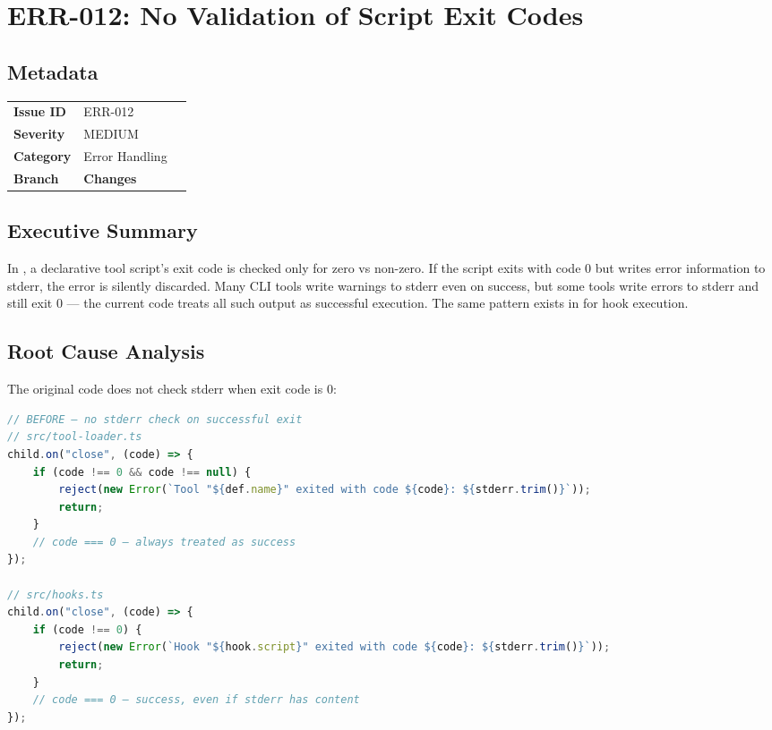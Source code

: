 \section{ERR-012: No Validation of Script Exit Codes}
\label{sec:err-012}
\subsection*{Metadata}
\begin{tabular}{ll}
\textbf{Issue ID} & ERR-012 \\
\textbf{Severity} & MEDIUM \\
\textbf{Category} & Error Handling \\
\textbf{Branch} & 
\textbf{Changes} &  \\
\end{tabular}

\subsection*{Executive Summary}
In , a declarative tool script's exit code is checked only for zero vs non-zero. If the script exits with code 0 but writes error information to stderr, the error is silently discarded. Many CLI tools write warnings to stderr even on success, but some tools write errors to stderr and still exit 0 — the current code treats all such output as successful execution. The same pattern exists in  for hook execution.

\subsection*{Root Cause Analysis}
The original code does not check stderr when exit code is 0:

\begin{lstlisting}[language=TypeScript]
// BEFORE — no stderr check on successful exit
// src/tool-loader.ts
child.on("close", (code) => {
    if (code !== 0 && code !== null) {
        reject(new Error(`Tool "${def.name}" exited with code ${code}: ${stderr.trim()}`));
        return;
    }
    // code === 0 — always treated as success
});

// src/hooks.ts
child.on("close", (code) => {
    if (code !== 0) {
        reject(new Error(`Hook "${hook.script}" exited with code ${code}: ${stderr.trim()}`));
        return;
    }
    // code === 0 — success, even if stderr has content
});
\end{lstlisting}

